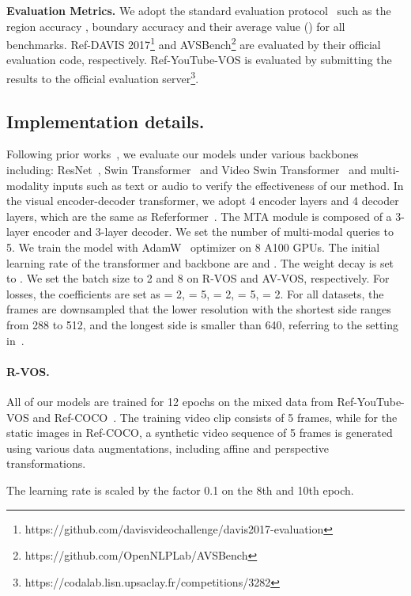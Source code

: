 \documentclass{article}
\begin{document}
\textbf{Evaluation Metrics.} We adopt the standard evaluation protocol~\cite{perazzi2016benchmark,pont20172017} such as the region accuracy ,  boundary accuracy   and their average value () for all benchmarks.
Ref-DAVIS 2017\footnote{https://github.com/davisvideochallenge/davis2017-evaluation} and AVSBench\footnote{https://github.com/OpenNLPLab/AVSBench} are evaluated by their official evaluation code, respectively. Ref-YouTube-VOS is evaluated by submitting the results to the official evaluation server\footnote{https://codalab.lisn.upsaclay.fr/competitions/3282}.

\subsection{Implementation details.}\label{implementation}
Following prior works~\cite{wu2022language}, we evaluate our models under various backbones including: ResNet~\cite{he2016deep}, Swin Transformer~\cite{liu2021swin} and Video Swin Transformer~\cite{liu2022video} and multi-modality inputs such as text or audio to verify the effectiveness of our method. In the visual encoder-decoder transformer, we adopt 4 encoder layers and 4 decoder layers, which are the same as Referformer~\cite{wu2022language}. The MTA module is composed of a 3-layer encoder and 3-layer decoder. 
We set the number of multi-modal queries to 5.
We train the model with AdamW~\cite{loshchilov2017decoupled} optimizer on 8 A100 GPUs.
The initial learning rate of the transformer and backbone are  and . The weight decay is set to .
We set the batch size to 2 and 8 on R-VOS and AV-VOS, respectively. For losses, the coefficients are set as  = 2, = 5,  = 2,  = 5,  = 2. For all datasets, the frames are downsampled that the lower resolution with the shortest side ranges from 288 to 512, and the longest side is smaller than 640, referring to the setting in~\cite{wu2022language}.


\paragraph{R-VOS.} All of our models are trained for 12 epochs on the mixed data from Ref-YouTube-VOS and Ref-COCO~\cite{yu2016modeling}. The training video clip consists of 5 frames, while for the static images in Ref-COCO, a synthetic video sequence of 5 frames is generated using various data augmentations, including affine and perspective transformations.

The learning rate is scaled by the factor 0.1 on the 8th and 10th epoch.
\end{document}
